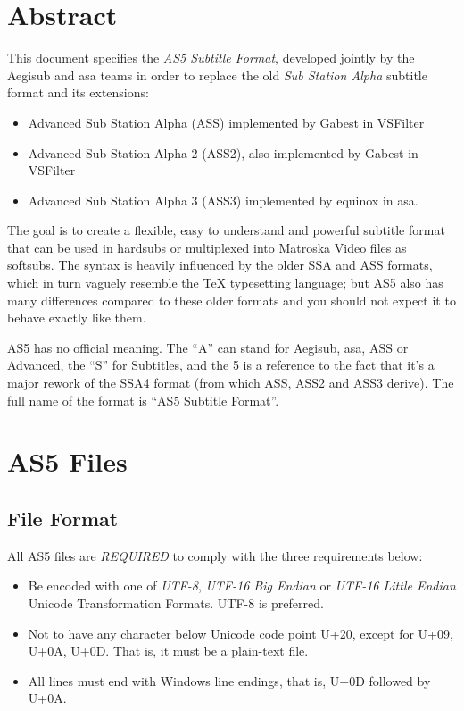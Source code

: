 \documentclass{spec}
\begin{document}
\setlength{\parskip}{0pt}
\tableofcontents
\newpage
\setlength{\parskip}{8pt}


\section{Abstract}
This document specifies the \emph{AS5 Subtitle Format}, developed jointly by the
Aegisub\cite{Aegisub} and asa\cite{asa} teams in order to replace the old
\emph{Sub Station Alpha}\cite{SSA} subtitle format and its extensions:

\begin{itemize}
\item Advanced Sub Station Alpha (ASS) implemented by Gabest in VSFilter\cite{VSFilter}
\item Advanced Sub Station Alpha 2 (ASS2), also implemented by Gabest in VSFilter
\item Advanced Sub Station Alpha 3 (ASS3) implemented by equinox in asa.
\end{itemize}

The goal is to create a flexible, easy to understand and powerful subtitle format
that can be used in hardsubs or multiplexed into Matroska Video\cite{mkv} files as
softsubs. The syntax is heavily influenced by the older SSA and ASS formats, which in
turn vaguely resemble the TeX typesetting language; but AS5 also has many differences
compared to these older formats and you should not expect it to behave exactly like them.

AS5 has no official meaning. The ``A'' can stand for Aegisub, asa, ASS or Advanced,
the ``S'' for Subtitles, and the 5 is a reference to the fact that it's a major
rework of the SSA4 format (from which ASS, ASS2 and ASS3 derive). The full
name of the format is ``AS5 Subtitle Format''.


\newpage
\section{AS5 Files}
\subsection{File Format}
All AS5 files are \emph{REQUIRED} to comply with the three requirements below:

\begin{itemize}
\item Be encoded with one of \emph{UTF-8}\cite{UTF-8}, \emph{UTF-16 Big Endian}
\cite{UTF-16} or \emph{UTF-16 Little Endian} Unicode Transformation Formats. UTF-8 is
preferred.
\item Not to have any character below Unicode code point U+20, except for U+09, U+0A, U+0D.
That is, it must be a plain-text file.
\item All lines must end with Windows line endings, that is, U+0D followed by U+0A.
\end{itemize}
\end{document}
